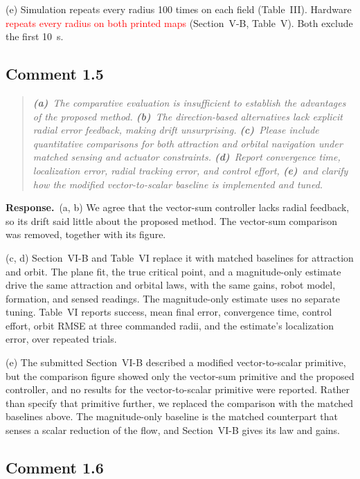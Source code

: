\documentclass[10pt]{article}
\newcommand{\syn}[1]{\textcolor{red}{#1}}            %
\newcommand{\resp}{\par\textbf{Response.}~}
\begin{document}
(e) Simulation repeats every radius 100 times on each field (Table~III). Hardware \syn{repeats every radius on both printed maps} (Section~V-B, Table~V). Both exclude the first 10~s.

\subsection*{Comment 1.5}

\begin{quote}\itshape
\textbf{(a)}~The comparative evaluation is insufficient to establish the advantages of the proposed method.
\textbf{(b)}~The direction-based alternatives lack explicit radial error feedback, making drift unsurprising.
\textbf{(c)}~Please include quantitative comparisons for both attraction and orbital navigation under matched sensing and actuator constraints.
\textbf{(d)}~Report convergence time, localization error, radial tracking error, and control effort,
\textbf{(e)}~and clarify how the modified vector-to-scalar baseline is implemented and tuned.
\end{quote}


\resp (a, b) We agree that the vector-sum controller lacks radial feedback, so its drift said little about the proposed method. The vector-sum comparison was removed, together with its figure.

(c, d) Section~VI-B and Table~VI replace it with matched baselines for attraction and orbit. The plane fit, the true critical point, and a magnitude-only estimate drive the same attraction and orbital laws, with the same gains, robot model, formation, and sensed readings. The magnitude-only estimate uses no separate tuning. Table~VI reports success, mean final error, convergence time, control effort, orbit RMSE at three commanded radii, and the estimate's localization error, over repeated trials.

(e) The submitted Section~VI-B described a modified vector-to-scalar primitive, but the comparison figure showed only the vector-sum primitive and the proposed controller, and no results for the vector-to-scalar primitive were reported. Rather than specify that primitive further, we replaced the comparison with the matched baselines above. The magnitude-only baseline is the matched counterpart that senses a scalar reduction of the flow, and Section~VI-B gives its law and gains.

\subsection*{Comment 1.6}
\end{document}
